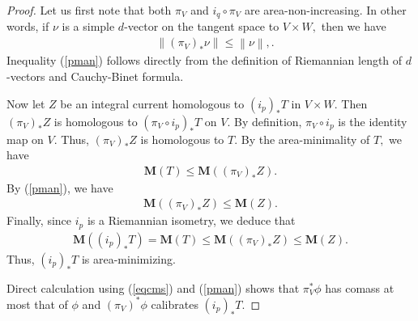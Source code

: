 \documentclass[10pt,a4paper]{amsart}
\newcommand{\du}{^\ast}
\newcommand{\ms}{\mathbf{M}}
\newcommand{\no}[1]{\left\lVert#1\right\rVert}
\newcommand{\pf}{_\ast}
\begin{document}
\begin{proof}
Let us first note that both $\pi_V$ and $i_q\circ\pi_V$ are area-non-increasing. In other words, if $\nu$ is a simple $d$-vector on the tangent space to $V\times W,$ then we have 
\begin{align}
&\no{(\pi_V)\pf \nu}\le \no{\nu},\label{pman}.%
\end{align}
Inequality (\ref{pman}) follows directly from the definition of Riemannian length of $d$-vectors and Cauchy-Binet formula. %

Now let $Z$ be an integral current homologous to $(i_p)\pf T$ in $V\times W.$ Then $(\pi_V)\pf Z$ is homologous to $( \pi_V\circ i_p)\pf T$ on $V$.  By definition, $ \pi_V\circ i_p$ is the identity map on $V.$ Thus, $(\pi_V)\pf Z$ is homologous to $T.$ By the area-minimality of $T,$ we have
\begin{align*}
\ms(T)\le \ms((\pi_V)\pf Z).
\end{align*}
By (\ref{pman}), we have
\begin{align*}
\ms((\pi_V)\pf Z)\le\ms(Z).
\end{align*}
Finally, since $i_p$ is a Riemannian isometry, we deduce that
\begin{align*}
\ms((i_p)\pf T)=\ms(T)\le \ms((\pi_V)\pf Z)\le\ms(Z).
\end{align*}
Thus, $(i_p)\pf T$ is area-minimizing.

Direct calculation using (\ref{eqcms}) and (\ref{pman}) shows that $\pi_V\du \phi$ has comass at most that of $\phi$ and $(\pi_V)\du\phi$ calibrates $(i_p)\pf T.$ 
\end{proof}
\end{document}
